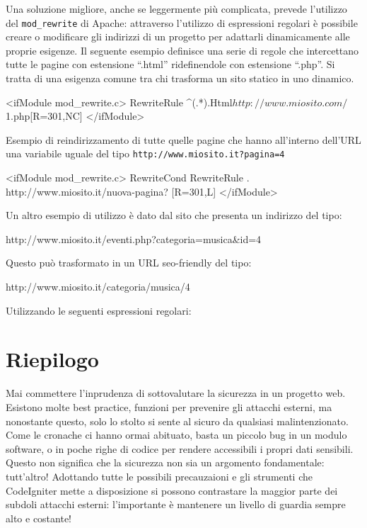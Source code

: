 Una soluzione migliore, anche se leggermente più complicata, prevede l'utilizzo del \verb|mod_rewrite| di Apache: attraverso l'utilizzo di espressioni regolari è possibile creare o modificare gli indirizzi di un progetto per adattarli dinamicamente alle proprie esigenze. Il seguente esempio definisce una serie di regole che intercettano tutte le pagine con estensione ``.html'' ridefinendole con estensione ``.php''. Si tratta di una esigenza comune tra chi trasforma un sito statico in uno dinamico.

\begin{code}
<ifModule mod_rewrite.c>
RewriteRule ^(.*).Html$ http://www.miosito.com/$1.php[R=301,NC]
</ifModule>
\end{code}

Esempio di reindirizzamento di tutte quelle pagine che hanno all'interno dell'\ac{URL} una variabile uguale del tipo \verb|http://www.miosito.it?pagina=4|

\begin{code}
<ifModule mod_rewrite.c>
RewriteCond %
RewriteRule . http://www.miosito.it/nuova-pagina? [R=301,L]
</ifModule>
\end{code}

Un altro esempio di utilizzo è dato dal sito che presenta un indirizzo del tipo:  

\begin{code}
http://www.miosito.it/eventi.php?categoria=musica&id=4
\end{code}

Questo può trasformato in un \ac{URL} seo-friendly del tipo:

\begin{code}
http://www.miosito.it/categoria/musica/4
\end{code}

Utilizzando le seguenti espressioni regolari:


\section*{Riepilogo}
Mai commettere l'inprudenza di sottovalutare la sicurezza in un progetto web. Esistono molte best practice, funzioni per prevenire gli attacchi esterni, ma nonostante questo, solo lo stolto si sente al sicuro da qualsiasi malintenzionato. Come le cronache ci hanno ormai abituato, basta un piccolo bug in un modulo software, o in poche righe di codice per rendere accessibili i propri dati sensibili. Questo non significa che la sicurezza non sia un argomento fondamentale: tutt'altro! Adottando tutte le possibili precauzaioni e gli strumenti che CodeIgniter mette a disposizione si possono contrastare la maggior parte dei subdoli attacchi esterni: l'importante è mantenere un livello di guardia sempre alto e costante!